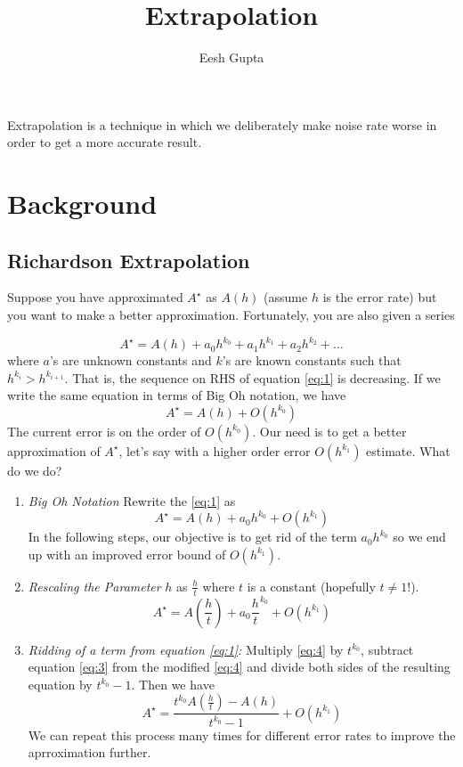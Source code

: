 \documentclass{article}
\title{Extrapolation}
\author{Eesh Gupta}
\begin{document}
\maketitle

Extrapolation is a technique in which we deliberately make noise rate worse in
order to get a more accurate result.
\section{Background}
\subsection{Richardson Extrapolation}
Suppose you have approximated \(A^\star\) as \(A(h)\) (assume \(h\) is
the error rate) but you want to make
a better approximation. Fortunately, you are also given a series

\begin{equation} \label{eq:1}
  A^\star = A(h) + a_0h^{k_0} + a_1h^{k_1} + a_2h^{k_2} + \ldots
\end{equation}
where \(a\)'s are unknown constants and \(k\)'s are known constants such that
\(h^{k_i} > h^{k_{i+1}}\). That is, the sequence on RHS of equation \ref{eq:1} is
decreasing. If we write the same equation in terms of Big Oh notation,
we have
\begin{equation} \label{eq:2}
  A^\star = A(h) + O(h^{k_0})
\end{equation}
The current error is on the order of \(O(h^{k_0})\).
Our need is to get a better approximation of \(A^\star\), let's say with
a higher order error \(O(h^{k_1})\) estimate. What do we do?
\begin{enumerate}
  \item \textit{Big Oh Notation} Rewrite the \ref{eq:1} as
  \begin{equation} \label{eq:3}
    A^\star = A(h) + a_0h^{k_0} + O(h^{k_1})
  \end{equation}
  In the following steps, our objective is to get rid of the term
   \(a_0h^{k_0}\) so we end up with an improved error bound of
   \(O(h^{k_1})\).
  \item \textit{Rescaling the Parameter} \(h\) as \(\frac{h}{t}\) where
  \(t\) is a constant (hopefully \(t \neq 1\)!).
  \begin{equation} \label{eq:4}
    A^\star = A(\frac{h}{t}) + a_0{\frac{h}{t}}^{k_0} + O(h^{k_1})
  \end{equation}


  \item \textit{Ridding of a term from equation \ref{eq:1}:} Multiply \ref{eq:4} by
  \(t^{k_0}\), subtract equation \ref{eq:3} from the modified \ref{eq:4} and divide
  both sides of the resulting equation by \(t^{k_0} -1 \). Then we have
  \begin{equation} \label{eq:5}
    A^\star = \frac{t^{k_0}A(\frac{h}{t}) -A(h)}{t^{k_0} -1} + O(h^{k_1})
  \end{equation}
  We can repeat this process many times for different error rates to improve
  the aprroximation further.
\end{enumerate}
\end{document}
